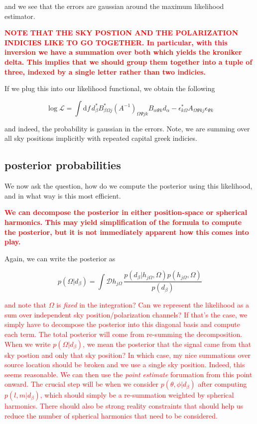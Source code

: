 \documentclass[10pt]{article}
\begin{document}
and we see that the errors are gaussian around the maximum likelihood estimator.

\textcolor{red}{\textbf{NOTE THAT THE SKY POSTION AND THE POLARIZATION INDICIES LIKE TO GO TOGETHER. In particular, with this inversion we have a summation over both which yields the kroniker delta. This implies that we should group them together into a tuple of three, indexed by a single letter rather than two indicies.}}

If we plug this into our likelihood functional, we obtain the following 

\begin{equation}
\log \mathcal{L} = \int\mathrm{d}f\, d_\beta^\ast B_{\beta\Omega j}^\ast \left( A^{-1}\right)_{\Omega\Psi j k} B_{\alpha\Psi k} d_\alpha - \epsilon_{k\Omega}^\ast A_{\Omega\Psi k j} \epsilon_{\Psi k}
\end{equation}

and indeed, the probability is gaussian in the errors. Note, we are summing over all sky positions implicitly with repeated capital greek indicies. 

\subsection{posterior probabilities}

We now ask the question, how do we compute the posterior using this likelihood, and in what way is this most efficient.

\textcolor{red}{\textbf{We can decompose the posterior in either position-space or spherical harmonics. This may yield simplification of the formula to compute the posterior, but it is not immediately apparent how this comes into play.}}

Again, we can write the posterior as 

\begin{equation}
p(\Omega|d_\beta) = \int\mathcal{D}h_{j\Omega}\, \frac{p(d_\beta|h_{j\Omega}, \Omega)p(h_{j\Omega}, \Omega)}{p(d_\beta)}
\end{equation}

\textcolor{red}{and note that $\Omega$ is \emph{fixed} in the integration? Can we represent the likelihood as a sum over independent sky position/polarization channels? If that's the case, we simply have to decompose the posterior into this diagonal basis and compute each term. The total posterior will come from re-summing the decomposition. When we write $p(\Omega|d_\beta)$, we mean the posterior that the signal came from that sky postion and only that sky position? In which case, my nice summations over source location should be broken and we use a single sky position. Indeed, this seems reasonable. We can then use the \emph{point estimate} forumation from this point onward. The crucial step will be when we consider $p(\theta,\phi|d_\beta)$ after computing $p(l,m|d_\beta)$, which should simply be a re-summation weighted by spherical harmonics. There should also be strong reality constraints that should help us reduce the number of spherical harmonics that need to be considered.}
\end{document}
